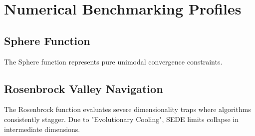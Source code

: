 \documentclass[conference]{IEEEtran}
\begin{document}
\section{Numerical Benchmarking Profiles}

\subsection{Sphere Function}
The Sphere function represents pure unimodal convergence constraints.
\begin{table}[htbp]
\centering
\caption{Sphere Function: Mean Best Evaluation (30 Runs)}
\end{table}

\subsection{Rosenbrock Valley Navigation}
The Rosenbrock function evaluates severe dimensionality traps where algorithms consistently stagger. Due to "Evolutionary Cooling", SEDE limits collapse in intermediate dimensions.
\begin{table}[htbp]
\centering
\caption{Rosenbrock Function: Mean Best Evaluation (30 Runs)}
\end{table}
\end{document}
